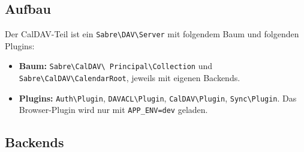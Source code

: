 \documentclass[a4paper,fontsize=10pt]{scrartcl}
\newcommand{\code}[1]{\texttt{#1}}
\begin{document}
\subsection{Aufbau}

Der CalDAV-Teil ist ein \code{Sabre\textbackslash DAV\textbackslash Server}
mit folgendem Baum und folgenden Plugins:

\begin{itemize}
  \item \textbf{Baum:} \code{Sabre\textbackslash CalDAV\textbackslash
        Principal\textbackslash Collection} und
        \code{Sabre\textbackslash CalDAV\textbackslash CalendarRoot}, jeweils
        mit eigenen Backends.
  \item \textbf{Plugins:} \code{Auth\textbackslash Plugin},
        \code{DAVACL\textbackslash Plugin}, \code{CalDAV\textbackslash Plugin},
        \code{Sync\textbackslash Plugin}. Das Browser-Plugin wird nur mit
        \code{APP\_ENV=dev} geladen.
\end{itemize}

\subsection{Backends}
\end{document}

